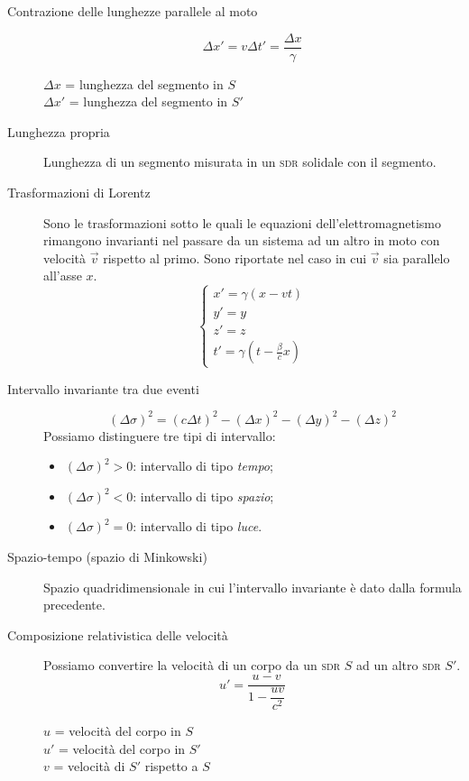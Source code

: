 \documentclass[a4paper,11pt,italian]{article}
\begin{document}
\begin{description}
  \item[Contrazione delle lunghezze parallele al moto] 
  \[ \Delta x' = v \Delta t' = \frac{\Delta x}{\gamma} \]
  \begin{multicols}{2}
  $ \Delta x $ = lunghezza del segmento in $ S $\\
  $ \Delta x' $ = lunghezza del segmento in $ S' $
  \end{multicols}
  
  \item[Lunghezza propria] Lunghezza di un segmento misurata in un \textsc{sdr} solidale con il segmento.
  
  \item[Trasformazioni di Lorentz]
  Sono le trasformazioni sotto le quali le equazioni dell'elettromagnetismo rimangono invarianti nel passare da un sistema ad un altro in moto con velocità $ \vec{v} $ rispetto al primo.
  Sono riportate nel caso in cui $ \vec{v} $ sia parallelo all'asse $ x $.
  \[
  \left\{ 
  \begin{array}{l}
  x' = \gamma (x -vt) \\ 
  y' = y \\ 
  z' = z \\
  t' = \gamma \left(  t - \frac{\beta}{c}x  \right)
  \end{array}
  \right. 
  \]
  \item[Intervallo invariante tra due eventi] 
  \[ (\Delta \sigma)^2 = (c\Delta t)^2 - (\Delta x)^2 - (\Delta y)^2 - (\Delta z)^2 \]
  Possiamo distinguere tre tipi di intervallo:
  \begin{itemize}
    \item $ (\Delta \sigma)^2 > 0 $: intervallo di tipo \emph{tempo};
    \item $ (\Delta \sigma)^2 < 0 $: intervallo di tipo \emph{spazio};
    \item $ (\Delta \sigma)^2 = 0 $: intervallo di tipo \emph{luce}.
  \end{itemize}
  
  \item[Spazio-tempo (spazio di Minkowski)]
  Spazio quadridimensionale in cui l'intervallo invariante è dato dalla formula precedente.
  
  \item[Composizione relativistica delle velocità]
  Possiamo convertire la velocità di un corpo da un \textsc{sdr} $ S $ ad un altro \textsc{sdr} $ S' $.
  \[ u' = \frac{u - v}{1- \dfrac{u v}{c^2}} \]
  \begin{multicols}{2}
  $ u $ = velocità del corpo in $ S $\\
  $ u' $ = velocità del corpo in $ S' $\\
  $ v $ = velocità di $ S' $ rispetto a $ S $
  \end{multicols}
  

\end{description}
\end{document}
